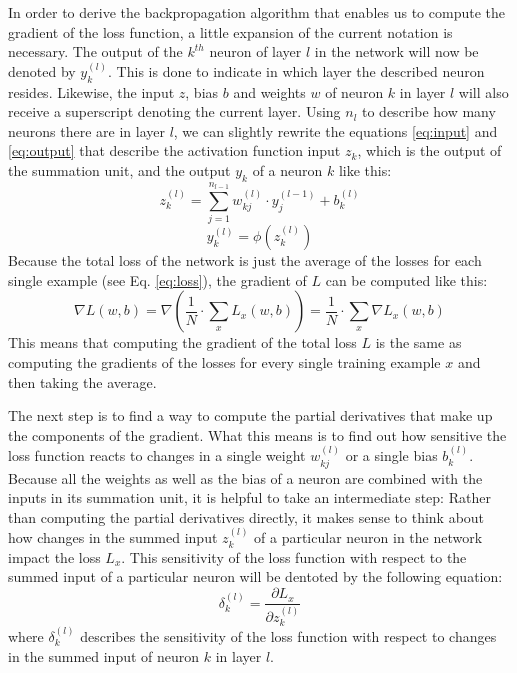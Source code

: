In order to derive the backpropagation algorithm that enables us to
compute the gradient of the loss function, a little expansion of the
current notation is necessary. The output of the \(k^{th}\) neuron of
layer \(l\) in the network will now be denoted by \(y_k^{(l)}\). This
is done to indicate in which layer the described neuron
resides. Likewise, the input \(z\), bias \(b\) and weights \(w\) of
neuron \(k\) in layer \(l\) will also
receive a superscript denoting the current layer. Using \(n_l\) to
describe how many neurons there are in layer
\(l\), we can slightly rewrite the equations \ref{eq:input} and
\ref{eq:output} that describe the activation function input
\(z_k\), which is the output of the summation unit, and the output
\(y_k\) of a neuron \(k\) like this:
\begin{equation}
  z_k^{(l)} = \sum_{j=1}^{n_{l-1}}{w_{kj}^{(l)} \cdot y_j^{(l-1)}} + b_k^{(l)}
\end{equation}
\begin{equation}
  y_k^{(l)} = \phi(z_k^{(l)})
\end{equation}
Because the total loss of the network is just the average of the
losses for each single example (see Eq. \ref{eq:loss}), the gradient of
\(L\) can be computed like this:
\begin{equation}
  \nabla L(w, b) = \nabla\left(\frac{1}{N} \cdot \sum_x{L_x(w, b)}
  \right) = \frac{1}{N} \cdot \sum_x{\nabla L_x(w, b)}
\end{equation}
This means that computing the gradient of the total loss \(L\) is the
same as computing the gradients of the losses for every single
training example \(x\) and then taking the average.

The next step is to find a way to compute the partial derivatives that
make up the components of the gradient. What this means is to find out
how sensitive the loss function reacts to changes in a single weight
\(w_{kj}^{(l)}\) or a single bias \(b_k^{(l)}\). Because all the
weights as well as the bias of a neuron are combined with the inputs
in its summation
unit, it is helpful to take an intermediate step: Rather than
computing the partial derivatives directly, it makes sense to think
about how changes
in the summed input \(z_k^{(l)}\)
of a particular neuron in the network impact the loss \(L_x\). This
sensitivity of the loss function with respect to the summed input of a
particular neuron will be dentoted by the following equation:
\begin{equation}
  \delta_k^{(l)} = \frac{\partial L_x}{\partial z_k^{(l)}}
\end{equation}
where \(\delta_k^{(l)}\) describes the sensitivity of the loss function
with respect to changes in the summed input of neuron \(k\) in layer
\(l\).

